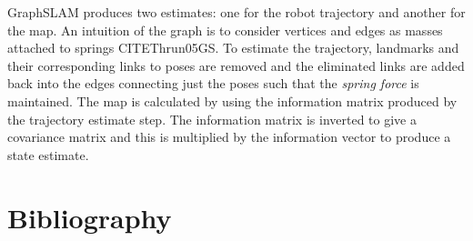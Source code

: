 \documentclass[12pt]{report}
\begin{document}
GraphSLAM produces two estimates: one for the robot trajectory and another for the map.  An intuition of the graph is to consider vertices and edges as masses attached to springs CITE{Thrun05GS}.  To estimate the trajectory, landmarks and their corresponding links to poses are removed and the eliminated links are added back into the edges connecting just the poses such that the \emph{spring force} is maintained.  The map is calculated by using the information matrix produced by the trajectory estimate step.  The information matrix is inverted to give a covariance matrix and this is multiplied by the information vector to produce a state estimate.  


\chapter{Bibliography}

{}
\end{document}
